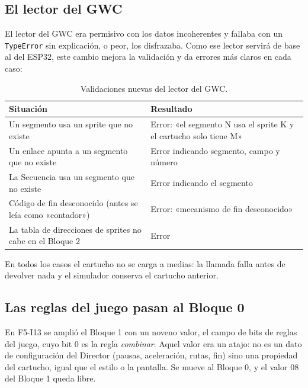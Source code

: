 \subsection{El lector del GWC}
\label{sec:F5I14Lector}

El lector del GWC era permisivo con los datos incoherentes y fallaba con un \texttt{TypeError} sin explicación, o peor, los disfrazaba. Como ese lector servirá de base al del ESP32, este cambio mejora la validación y da errores más claros en cada caso:

\begin{table}[H]
	\centering
	\begin{tabularx}{\textwidth}{>{\RaggedRight\arraybackslash}X >{\RaggedRight\arraybackslash}X}
		\toprule
		\textbf{Situación} & \textbf{Resultado} \\
		\midrule
		Un segmento usa un sprite que no existe & Error: «el segmento N usa el sprite K y el cartucho solo tiene M» \\
		Un enlace apunta a un segmento que no existe & Error indicando segmento, campo y número \\
		La Secuencia usa un segmento que no existe & Error indicando el segmento \\
		Código de fin desconocido (antes se leía como «contador») & Error: «mecanismo de fin desconocido» \\
		La tabla de direcciones de sprites no cabe en el Bloque 2 & Error \\
		\bottomrule
	\end{tabularx}
	\caption{Validaciones nuevas del lector del GWC.}
\end{table}

En todos los casos el cartucho no se carga a medias: la llamada falla antes de devolver nada y el simulador conserva el cartucho anterior.

\subsection{Las reglas del juego pasan al Bloque 0}
\label{sec:F5I14Reglas}

En F5-I13 se amplió el Bloque 1 con un noveno valor, el campo de bits de reglas del juego, cuyo bit 0 es la regla \emph{combinar}. Aquel valor era un atajo: no es un dato de configuración del Director (pausas, aceleración, rutas, fin) sino una propiedad del cartucho, igual que el estilo o la pantalla. Se mueve al Bloque 0, y el valor 08 del Bloque 1 queda libre.

